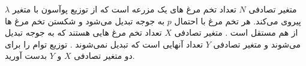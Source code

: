 متغیر تصادفی 
$N$
تعداد تخم مرغ های یک مزرعه است که از توزیع پوآسون با متغیر 
$\lambda$
پیروی می‌کند. هر تخم مرغ با احتمال
$p$
به جوجه تبدیل می‌شود و شکستن تخم مرغ ها از هم مستقل است . متغیر تصادفی 
$X$ 
تعداد تخم مرغ هایی هستند که به جوجه تبدیل می‌شوند و متغیر تصادفی
$Y$
 تعداد آنهایی است که تبدیل نمی‌شوند . توزیع توام را برای دو متغیر تصادفی  
$X$ و $Y$
 بدست آورید. 


